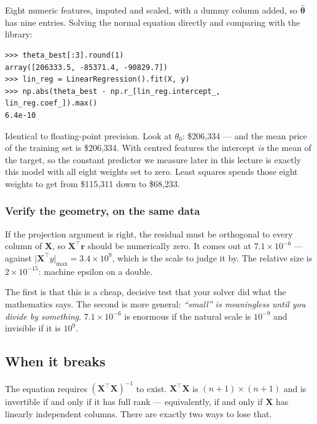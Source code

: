 \documentclass[11pt,a4paper]{article}
\begin{document}
Eight numeric features, imputed and scaled, with a dummy column added, so
$\hat{\boldsymbol\theta}$ has nine entries. Solving the normal equation
directly and comparing with the library:

\begin{center}
\small
\begin{verbatim}
>>> theta_best[:3].round(1)
array([206333.5, -85371.4, -90829.7])
>>> lin_reg = LinearRegression().fit(X, y)
>>> np.abs(theta_best - np.r_[lin_reg.intercept_, lin_reg.coef_]).max()
6.4e-10
\end{verbatim}
\end{center}

Identical to floating-point precision. Look at $\theta_0$: \$206{,}334 --- and
the mean price of the training set is \$206{,}334. With centred features the
intercept \emph{is} the mean of the target, so the constant predictor we
measure later in this lecture is exactly this model with all eight weights set
to zero. Least squares spends those eight weights to get from \$115{,}311 down
to \$68{,}233.

\subsubsection{Verify the geometry, on the same data}

If the projection argument is right, the residual must be orthogonal to every
column of $\mathbf{X}$, so $\mathbf{X}^{\intercal}\mathbf{r}$ should be
numerically zero. It comes out at $7.1\times10^{-6}$ --- against
$\lvert\mathbf{X}^{\intercal}y\rvert_{\max} = 3.4\times10^{9}$, which is the
scale to judge it by. The relative size is $2\times10^{-15}$: machine epsilon
on a double.

\begin{keybox}[title={Two lessons in one check}]
The first is that this is a cheap, decisive test that your solver did what the
mathematics says. The second is more general: \emph{``small'' is meaningless
until you divide by something}. $7.1\times10^{-6}$ is enormous if the natural
scale is $10^{-9}$ and invisible if it is $10^{9}$.
\end{keybox}

\subsection{When it breaks}

The equation requires $(\mathbf{X}^{\intercal}\mathbf{X})^{-1}$ to exist.
$\mathbf{X}^{\intercal}\mathbf{X}$ is $(n{+}1)\times(n{+}1)$ and is invertible
if and only if it has full rank --- equivalently, if and only if $\mathbf{X}$
has linearly independent columns. There are exactly two ways to lose that.
\end{document}
